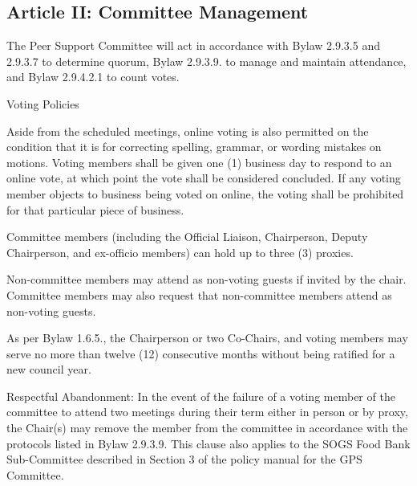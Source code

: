 \subsection{Article II: Committee Management}
\begin{longenum}[ label*=\thesubsection.\arabic*., align=left] 		
	\item The Peer Support Committee will act in accordance with Bylaw 2.9.3.5 and 2.9.3.7 to determine quorum, Bylaw 2.9.3.9. to manage and maintain attendance, and Bylaw 2.9.4.2.1 to count votes.
	\item Voting Policies
		\begin{longenum}[label*=\arabic*., align=left]
		\item Aside from the scheduled meetings, online voting is also permitted on the condition that it is for correcting spelling, grammar, or wording mistakes on motions. Voting members shall be given one (1) business day to respond to an online vote, at which point the vote shall be considered concluded. If any voting member objects to business being voted on online, the voting shall be prohibited for that particular piece of business.
		\item Committee members (including the Official Liaison, Chairperson, Deputy Chairperson, and ex-officio members) can hold up to three (3) proxies.
		\end{longenum}
	\item Non-committee members may attend as non-voting guests if invited by the chair. Committee members may also request that non-committee members attend as non-voting guests. 
	\item As per Bylaw 1.6.5., the Chairperson or two Co-Chairs, and voting members may serve no more than twelve (12) consecutive months without being ratified for a new council year.
	\item Respectful Abandonment: In the event of the failure of a voting member of the committee to attend two meetings during their term either in person or by proxy, the Chair(s) may remove the member from the committee in accordance with the protocols listed in Bylaw 2.9.3.9. This clause also applies to the SOGS Food Bank Sub-Committee described in Section 3 of the policy manual for the GPS Committee.
\end{longenum}

